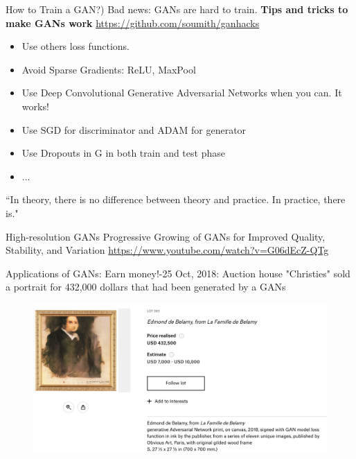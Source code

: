 \documentclass[xcolor=pdftex,dvipsnames,table,mathserif]{beamer}
\begin{document}
\begin{frame}{How to Train a GAN?)}
\alert{Bad news: GANs are hard to train}.
\textbf{ Tips and tricks to make GANs work}
\url{https://github.com/soumith/ganhacks}
\begin{itemize}
\item Use others loss functions.
\item Avoid Sparse Gradients: ReLU, MaxPool
\item Use Deep Convolutional Generative Adversarial Networks when you can. It works!
\item Use SGD for discriminator and ADAM for generator
\item Use Dropouts in G in both train and test phase
\item ...
\end{itemize}
\alert{``In theory, there is no difference between theory and practice. In practice, there is."}
\end{frame}

\begin{frame}{High-resolution GANs}
Progressive Growing of GANs for Improved Quality, Stability, and Variation \cite{karras2017progressive}
\url{https://www.youtube.com/watch?v=G06dEcZ-QTg}
\end{frame}

\begin{frame}{Applications of GANs: Earn money!}-25 Oct, 2018:  Auction house "Christies" sold a portrait for 432,000 dollars that had been generated by a GANs
 \begin{figure}
\includegraphics[width=.95\columnwidth]{../graphics/Christie}
\end{figure}
\end{frame}
\end{document}
